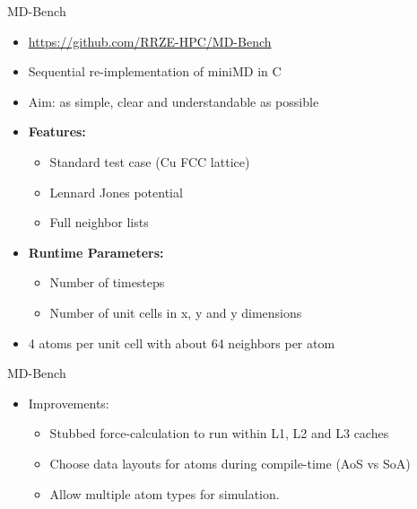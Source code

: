 \documentclass[aspectratio=169,t]{beamer}
\begin{document}
  \begin{frame}[fragile]{MD-Bench}
    \begin{itemize}
      \item \url{https://github.com/RRZE-HPC/MD-Bench}
      \item Sequential re-implementation of miniMD in C
      \item Aim: as simple, clear and understandable as possible
      \item \textbf{Features:}
      \begin{itemize}
        \item Standard test case (Cu FCC lattice)
        \item Lennard Jones potential
        \item Full neighbor lists
      \end{itemize}
      \item \textbf{Runtime Parameters:}
      \begin{itemize}
        \item Number of timesteps
        \item Number of unit cells in x, y and y dimensions 
      \end{itemize}
      \item 4 atoms per unit cell with about 64 neighbors per atom
    \end{itemize}
  \end{frame}

  \begin{frame}[fragile]{MD-Bench}
    \begin{itemize}
      \item Improvements:
      \begin{itemize}
        \item Stubbed force-calculation to run within L1, L2 and L3 caches
        \item Choose data layouts for atoms during compile-time (AoS vs SoA)
        \item Allow multiple atom types for simulation.
      \end{itemize}
    \end{itemize}
  \end{frame}
\end{document}

